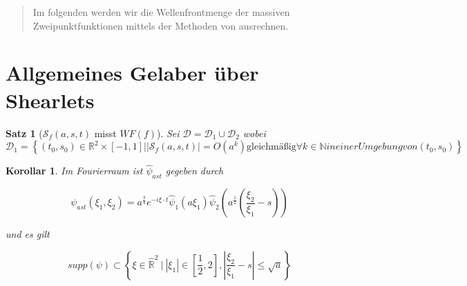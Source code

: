 \documentclass{scrartcl}
\newtheorem{theorem}{Satz}
\newtheorem{corrolary}{Korollar}
\begin{document}
\newpage
\maketitle
\begin{abstract}
    Im folgenden werden wir die Wellenfrontmenge der massiven Zweipunktfunktionen
    mittels der Methoden von \textcite{Kutyniok2008} ausrechnen.
\end{abstract}



\section{Allgemeines Gelaber über Shearlets} %
\label{sec:allgemeines_gelaber_ueber_shearlets}


\begin{theorem}[$\mathcal{S}_f(a,s,t)$ misst $WF(f)$]
\label{thm:main_theorem}
    Sei $\mathcal{D} = \mathcal{D}_1 \cup \mathcal{D}_2$ wobei \\
    $\mathcal{D}_1 = \left\{
        (t_0, s_0) \in \mathbb{R}^2 \times [-1,1] \big|
        |\mathcal{S}_f (a, s, t)| = O(a^k) \textrm{gleichmäßig} \forall k \in \mathbb{N} in einer
        Umgebung von (t_0, s_0)
    \right\}$
\end{theorem}


\begin{corrolary}
\label{cor:psi_hat}
Im Fourierraum ist $\hat{\psi}_{ast}$ gegeben durch

\begin{equation}
    \psi_{ast}{(\xi_1, \xi_2)} = a^{\frac{3}{4}}e^{-i\xi \cdot t}\hat\psi_1(a \xi_1) \hat\psi_{2}\left(a^{\frac{1}{2}}\left(\frac{\xi_2}{\xi_1}-s\right)\right)
\end{equation}

und es gilt

\begin{equation}
\label{eq:supp_psi}
    supp(\psi) \subset \left\{\xi \in  \hat{\mathbb{R}}^2 ~\Big| ~|\xi_1| \in \left[\frac{1}{2} , 2\right], \left|\frac{\xi_2}{\xi_1} - s\right| \leq \sqrt{a} \right\}
\end{equation}

\end{corrolary}
\end{document}

